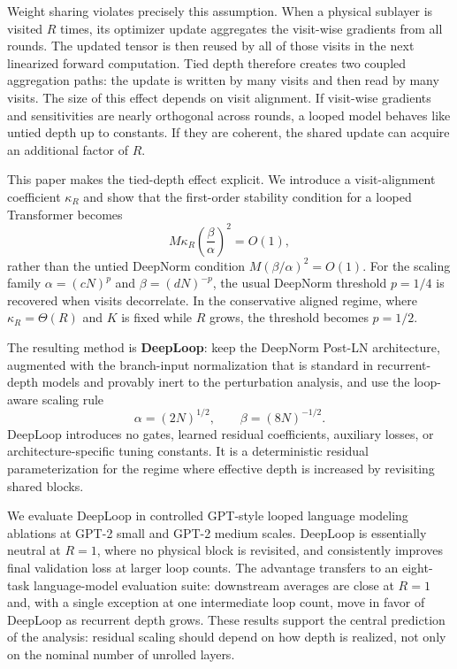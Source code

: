 \documentclass[11pt]{airesearch}
\begin{document}
Weight sharing violates precisely this assumption. When a physical sublayer is
visited $R$ times, its optimizer update aggregates the visit-wise gradients
from all rounds. The updated tensor is then reused by all of those visits in
the next linearized forward computation. Tied depth therefore creates two
coupled aggregation paths: the update is written by many visits and then read
by many visits. The size of this effect depends on visit alignment. If
visit-wise gradients and sensitivities are nearly orthogonal across rounds, a
looped model behaves like untied depth up to constants. If they are coherent,
the shared update can acquire an additional factor of $R$.

This paper makes the tied-depth effect explicit. We introduce a
visit-alignment coefficient $\kappa_R$ and show that the first-order stability
condition for a looped Transformer becomes
\[
  M\kappa_R\left(\frac{\beta}{\alpha}\right)^2 = O(1),
\]
rather than the untied DeepNorm condition $M(\beta/\alpha)^2=O(1)$. For the
scaling family $\alpha=(cN)^p$ and $\beta=(dN)^{-p}$, the usual DeepNorm
threshold $p=1/4$ is recovered when visits decorrelate. In the conservative
aligned regime, where $\kappa_R=\Theta(R)$ and $K$ is fixed while $R$ grows, the threshold becomes $p=1/2$.

The resulting method is \textbf{DeepLoop}: keep the DeepNorm Post-LN
architecture, augmented with the branch-input normalization that is standard
in recurrent-depth models \citep{geiping2025scaling} and provably inert to
the perturbation analysis, and use the loop-aware scaling rule
\[
  \alpha=(2N)^{1/2},
  \qquad
  \beta=(8N)^{-1/2}.
\]
DeepLoop introduces no gates, learned residual coefficients, auxiliary losses,
or architecture-specific tuning constants. It is a deterministic residual
parameterization for the regime where effective depth is increased by
revisiting shared blocks.

We evaluate DeepLoop in controlled GPT-style looped language modeling
ablations at GPT-2 small and GPT-2 medium scales. DeepLoop is essentially
neutral at $R=1$, where no physical block is revisited, and consistently
improves final validation loss at larger loop counts. The advantage transfers
to an eight-task language-model evaluation suite: downstream averages are
close at $R=1$ and, with a single exception at one intermediate loop count,
move in favor of DeepLoop as recurrent depth grows. These
results support the central prediction of the analysis: residual scaling
should depend on how depth is realized, not only on the nominal number of
unrolled layers.
\end{document}
